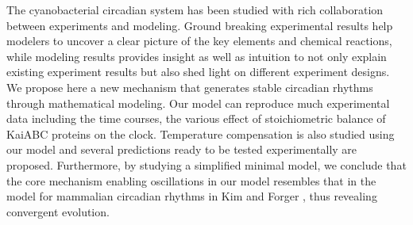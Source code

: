 \documentclass[a4paper,10pt]{article}
\numberwithin{equation}{section}
\begin{document}



The cyanobacterial circadian system has been studied with rich collaboration between experiments and modeling. Ground breaking experimental results help modelers to uncover a clear picture of the key elements and chemical reactions, while modeling results provides insight as well as intuition to not only explain existing experiment results but also shed light on different experiment designs. %
We propose here a new mechanism that generates stable circadian rhythms through mathematical modeling. Our model can reproduce much experimental data including the time courses, the various effect of stoichiometric balance of KaiABC proteins on the clock. Temperature compensation is also studied using our model and several predictions ready to be tested experimentally are proposed. Furthermore, by studying a simplified minimal model, we conclude that the core mechanism enabling oscillations in our model resembles that in the model for mammalian circadian rhythms in Kim and Forger \citet{forger2012}, thus revealing convergent evolution.
\end{document}
